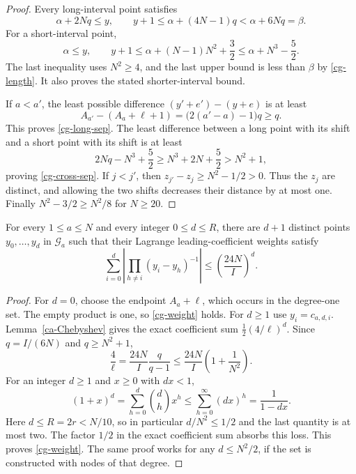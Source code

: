\begin{proof}
Every long-interval point satisfies
\[
 \alpha+2Nq\leq y,\qquad
             y+1\leq\alpha+(4N-1)q<\alpha+6Nq=\beta.
\]
For a short-interval point,
\[
 \alpha\leq y,\qquad
 y+1\leq\alpha+(N-1)N^2+\frac32
                      \leq\alpha+N^3-\frac52.
\]
The last inequality uses $N^2\geq4$, and the last upper
bound is less than $\beta$ by \eqref{cg-length}.
It also proves the stated shorter-interval bound.

If $a<a'$, the least possible difference
$(y'+e')-(y+e)$ is at least
\[
             A_{a'}-(A_a+\ell+1)
                    =\bigl(2(a'-a)-1\bigr)q\geq q.
\]
This proves \eqref{cg-long-sep}.
The least difference between a long point with its shift
and a short point with its shift is at least
\[
          2Nq-N^3+\frac52
                 \geq N^3+2N+\frac52>N^2+1,
\]
proving \eqref{cg-cross-sep}.
If $j<j'$, then
$z_{j'}-z_j\geq N^2-1/2>0$.
Thus the $z_j$ are distinct, and allowing the two shifts
decreases their distance by at most one.
Finally $N^2-3/2\geq N^2/8$ for $N\geq20$.
\end{proof}

\begin{proposition}
\label{cg-interpolation}
For every $1\leq a\leq N$ and every integer $0\leq d\leq R$,
there are $d+1$ distinct points $y_0,\ldots,y_d$ in
$\mathcal G_a$ such that their Lagrange leading-coefficient
weights satisfy
\begin{equation}\label{cg-weight}
 \sum_{i=0}^d\left|
       \prod_{h\ne i}(y_i-y_h)^{-1}\right|
                       \leq\left(\frac{24N}{I}\right)^d.
\end{equation}
\end{proposition}

\begin{proof}
For $d=0$, choose the endpoint $A_a+\ell$, which occurs
in the degree-one set.  The empty product is one, so
\eqref{cg-weight} holds.
For $d\geq1$ use $y_i=c_{a,d,i}$.
Lemma~\ref{ca-Chebyshev} gives the exact coefficient sum
$\frac12(4/\ell)^d$.  Since $q=I/(6N)$ and
$q\geq N^2+1$,
\[
 \frac4\ell=\frac{24N}{I}\frac{q}{q-1}
              \leq\frac{24N}{I}\left(1+\frac1{N^2}\right).
\]
For an integer $d\geq1$ and $x\geq0$ with $dx<1$,
\[
 (1+x)^d
     =\sum_{h=0}^d\binom dh x^h
     \leq\sum_{h=0}^{\infty}(dx)^h
     =\frac1{1-dx}.
\]
Here $d\leq R=2r<N/10$, so in particular
$d/N^2\leq1/2$ and the last quantity is at most two.
The factor $1/2$ in the exact coefficient sum absorbs
this loss.  This proves \eqref{cg-weight}.
The same proof works for any $d\leq N^2/2$, if the set
is constructed with nodes of that degree.
\end{proof}

